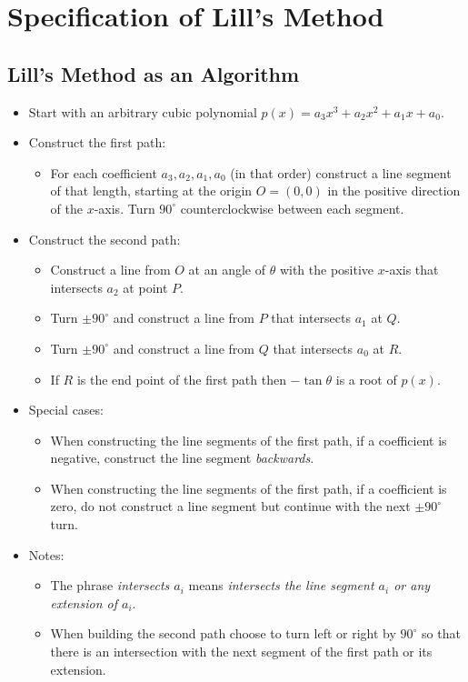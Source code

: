 \section{Specification of Lill's Method}\label{s.method}

\subsection{Lill's Method as an Algorithm}
\begin{itemize}
\item Start with an arbitrary cubic polynomial $p(x)=a_3x^3+a_2x^2+a_1x+a_0$.
\item Construct the first path:
\begin{itemize}
\item For each coefficient $a_3,a_2,a_1,a_0$ (in that order) construct a line segment of that length, starting at the origin $O=(0,0)$ in the positive direction of the $x$-axis. Turn $90^\circ$ counterclockwise between each segment.
\end{itemize}
\item Construct the second path:
\begin{itemize}
\item Construct a line from $O$ at an angle of $\theta$ with the positive $x$-axis that intersects $a_2$ at point $P$.
\item Turn $\pm 90^\circ$ and construct a line from $P$ that intersects $a_1$ at $Q$.
\item Turn $\pm 90^\circ$ and construct a line from $Q$ that intersects $a_0$ at $R$.
\item If $R$ is the end point of the first path then $-\tan\theta$ is a root of $p(x)$.
\end{itemize}
\item Special cases:
\begin{itemize}
\item When constructing the line segments of the first path, if a coefficient is negative, construct the line segment \emph{backwards}.
\item When constructing the line segments of the first path, if a coefficient is zero, do not construct a line segment but continue with the next $\pm 90^\circ$ turn.
\end{itemize}
\item Notes:
\begin{itemize}
\item The phrase \emph{intersects $a_i$} means \emph{intersects the line segment $a_i$ or any extension of $a_i$}.
\item When building the second path choose to turn left or right by $90^\circ$ so that there is an intersection with the next segment of the first path or its extension.
\end{itemize}
\end{itemize}


